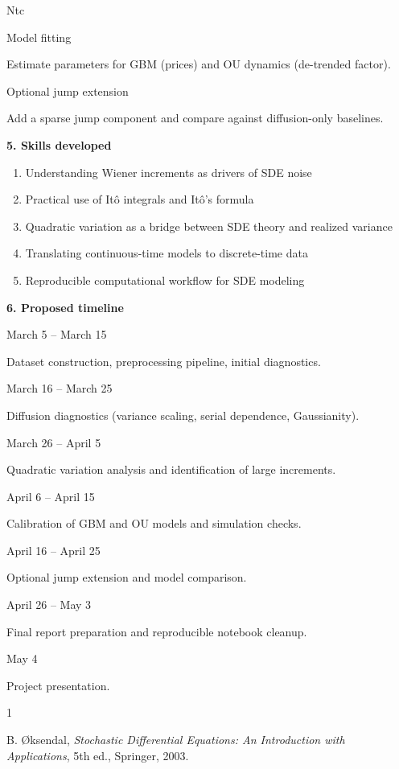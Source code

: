 Ntc\documentclass[11pt]{article}
\begin{document}
	Model fitting
	
	Estimate parameters for GBM (prices) and OU dynamics (de-trended factor).
	
	Optional jump extension
	
	Add a sparse jump component and compare against diffusion-only baselines.
	
	\textbf{5. Skills developed}
	
	\begin{enumerate}
		\item Understanding Wiener increments as drivers of SDE noise
		\item Practical use of Itô integrals and Itô’s formula
		\item Quadratic variation as a bridge between SDE theory and realized variance
		\item Translating continuous-time models to discrete-time data
		\item Reproducible computational workflow for SDE modeling
	\end{enumerate}
	
	\textbf{6. Proposed timeline}
	
	March 5 – March 15
	
	Dataset construction, preprocessing pipeline, initial diagnostics.
	
	March 16 – March 25
	
	Diffusion diagnostics (variance scaling, serial dependence, Gaussianity).
	
	March 26 – April 5
	
	Quadratic variation analysis and identification of large increments.
	
	April 6 – April 15
	
	Calibration of GBM and OU models and simulation checks.
	
	April 16 – April 25
	
	Optional jump extension and model comparison.
	
	April 26 – May 3
	
	Final report preparation and reproducible notebook cleanup.
	
	May 4
	
	Project presentation.
	
	\vspace{0.3cm}
	
	\begin{thebibliography}{1}
		
		B. Øksendal,
		\emph{Stochastic Differential Equations: An Introduction with Applications},
		5th ed., Springer, 2003.
		
	\end{thebibliography}
	
\end{document}
